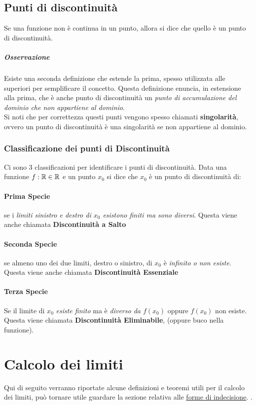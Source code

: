 \documentclass[12pt, a4paper, openany]{book}
\begin{document}
\subsection*{Punti di discontinuità}
Se una funzione non è continua in un punto, allora si dice che quello è un punto di discontinuità.
\subparagraph*{Osservazione} Esiste una seconda definizione che estende la prima, spesso utilizzata alle superiori per semplificare il concetto.
Questa definizione enuncia, in estensione alla prima, che è anche punto di discontinuità un \emph{punto di accumulazione del dominio che non appartiene al dominio}.
\\Si noti che per correttezza questi punti vengono spesso chiamati \textbf{singolarità}, ovvero un punto di discontinuità è una singolarità se non appartiene al dominio.
\subsubsection*{Classificazione dei punti di Discontinuità}
Ci sono 3 classificazioni per identificare i punti di discontinuità.
Data una funzione $f:\mathbb{R} \in \mathbb{R}$ e un punto $x_0$ si dice che $x_0$ è un punto di discontinuità di:
\paragraph{Prima Specie} se i \emph{limiti sinistro e destro di $x_0$ esistono finiti ma sono diversi}.
Questa viene anche chiamata \textbf{Discontinuità a Salto}
\paragraph{Seconda Specie} se almeno uno dei due limiti, destro o sinistro, di $x_0$ è \emph{infinito o non esiste}.
Questa viene anche chiamata \textbf{Discontinuità Essenziale}
\paragraph{Terza Specie} Se il limite di $x_0$ \emph{esiste finito} ma è \emph{diverso da $f(x_0)$} oppure $f(x_0)$ non esiste.
Questa viene chiamata \textbf{Discontinuità Eliminabile}, (oppure buco nella funzione).
\section{Calcolo dei limiti}
Qui di seguito verranno riportate alcune definizioni e teoremi utili per il calcolo 
dei limiti, può tornare utile guardare la sezione relativa alle
\hyperref[sec:forme_di_indecisione]{forme di indecisione}. 
. 
\end{document}
